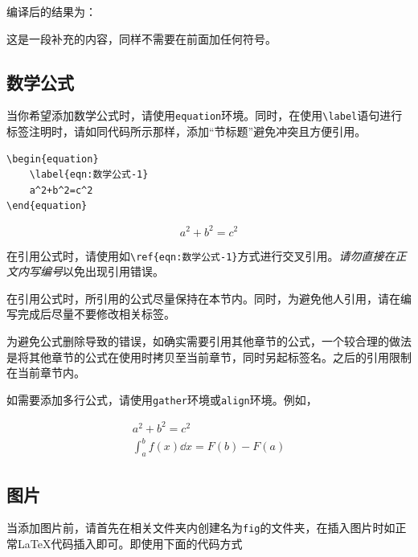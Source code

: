 编译后的结果为：

\begin{extend}
    这是一段补充的内容，同样不需要在前面加任何符号。
\end{extend}

\subsection{数学公式}\label{subsec:关于如何编写模板（教程）-数学公式}

当你希望添加数学公式时，请使用\verb|equation|环境。同时，在使用\verb|\label|语句进行标签注明时，请如同代码所示那样，添加“节标题”避免冲突且方便引用。

\begin{lstlisting}[frame=line]
\begin{equation}
    \label{eqn:数学公式-1}
    a^2+b^2=c^2
\end{equation}
\end{lstlisting}

\begin{equation}
    \label{eqn:数学公式-1}
    a^2+b^2=c^2
\end{equation}

在引用公式时，请使用如\verb|\ref{eqn:数学公式-1}|方式进行交叉引用。\emph{请勿直接在正文内写编号}以免出现引用错误。

\begin{attention}
    在引用公式时，所引用的公式尽量保持在本节内。同时，为避免他人引用，请在编写完成后尽量不要修改相关标签。

    为避免公式删除导致的错误，如确实需要引用其他章节的公式，一个较合理的做法是将其他章节的公式在使用时拷贝至当前章节，同时另起标签名。之后的引用限制在当前章节内。
\end{attention}

如需要添加多行公式，请使用\verb|gather|环境或\verb|align|环境。例如，

\begin{gather}
    a^2+b^2=c^2\label{eqn:数学公式-2}\\
    \int_a^bf(x)\dd{x}=F(b)-F(a)\label{eqn:数学公式-3}
\end{gather}

\subsection{图片}\label{subsec:关于如何编写模板（教程）-图片}

当添加图片前，请首先在相关文件夹内创建名为\verb|fig|的文件夹，在插入图片时如正常\LaTeX 代码插入即可。即使用下面的代码方式

